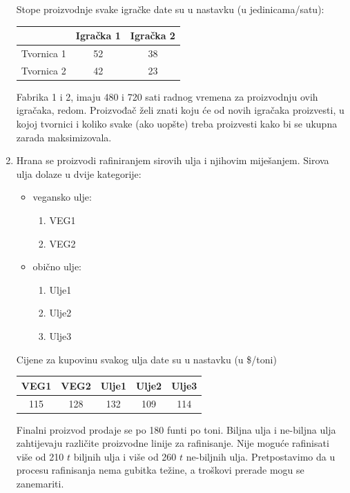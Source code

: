 \documentclass[a4paper, utf8, 11pt, colorlinks]{book}
\begin{document}
\begin{enumerate}
 
 Stope proizvodnje svake igračke date su u nastavku (u jedinicama/satu): 
  \begin{table}[H]
 	\centering
 	\begin{tabular}{l|cc} \hline
 		  \        &  Igračka 1 & Igračka 2 \\ \hline
 	Tvornica 1   &  52     &  38     \\
    Tvornica 2   &  42     &  23     \\	\hline
 	\end{tabular} 
 \end{table}
 Fabrika 1 i 2, imaju 480 i 720 sati radnog vremena za proizvodnju ovih igračaka, redom. Proizvođač želi znati koju će od novih igračaka proizvesti, u kojoj tvornici i koliko svake (ako uopšte) treba proizvesti kako bi se ukupna zarada maksimizovala. 
 \item %
 Hrana se proizvodi rafiniranjem sirovih ulja i njihovim miješanjem. Sirova ulja dolaze u dvije kategorije: 
 \begin{itemize}
 	\item vegansko ulje:
 	\begin{enumerate}
 		\item VEG1
 		\item VEG2 
 	\end{enumerate}
   \item obično ulje:
   \begin{enumerate}
   	\item Ulje1
   	\item Ulje2 
   	\item Ulje3
   \end{enumerate}
 \end{itemize}
Cijene za kupovinu svakog ulja date su u nastavku (u \$/toni)
\begin{table}[H]
 	\centering
 	\begin{tabular}{ccccc}
            VEG1 & VEG2 & Ulje1 & Ulje2 & Ulje3 \\ \hline
            115  & 128  & 132   & 109   & 114 \\ 	\hline	
    \end{tabular} 
\end{table}
Finalni proizvod prodaje se po 180 funti po toni. Biljna ulja i ne-biljna ulja zahtijevaju različite proizvodne linije za rafinisanje. Nije moguće rafinisati više od 210 $t$ biljnih ulja i više od 260 $t$ ne-biljnih ulja. Pretpostavimo da u procesu rafinisanja nema gubitka težine, a troškovi prerade mogu se zanemariti. 


\end{enumerate}
\end{document}
